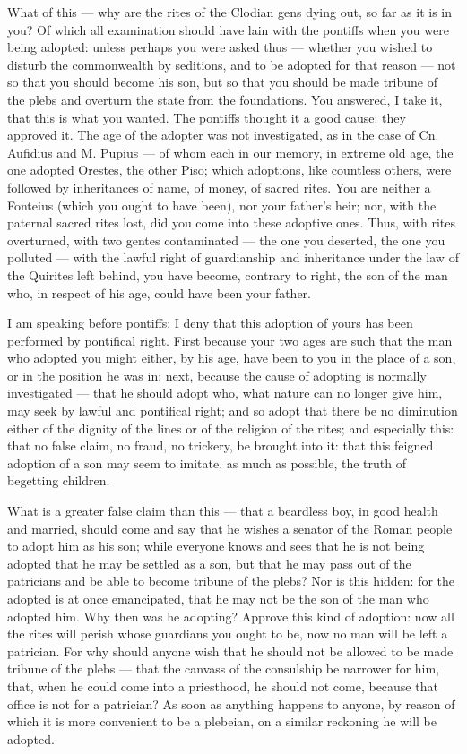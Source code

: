  What of this --- why are the rites of the Clodian gens dying out, so far as it is in you? Of which all examination should have lain with the pontiffs when you were being adopted: unless perhaps you were asked thus --- whether you wished to disturb the commonwealth by seditions, and to be adopted for that reason --- not so that you should become his son, but so that you should be made tribune of the plebs and overturn the state from the foundations. You answered, I take it, that this is what you wanted. The pontiffs thought it a good cause: they approved it. The age of the adopter was not investigated, as in the case of Cn. Aufidius and M. Pupius --- of whom each in our memory, in extreme old age, the one adopted Orestes, the other Piso; which adoptions, like countless others, were followed by inheritances of name, of money, of sacred rites. You are neither a Fonteius (which you ought to have been), nor your father's heir; nor, with the paternal sacred rites lost, did you come into these adoptive ones. Thus, with rites overturned, with two gentes contaminated --- the one you deserted, the one you polluted --- with the lawful right of guardianship and inheritance under the law of the Quirites left behind, you have become, contrary to right, the son of the man who, in respect of his age, could have been your father.

 I am speaking before pontiffs: I deny that this adoption of yours has been performed by pontifical right. First because your two ages are such that the man who adopted you might either, by his age, have been to you in the place of a son, or in the position he was in: next, because the cause of adopting is normally investigated --- that he should adopt who, what nature can no longer give him, may seek by lawful and pontifical right; and so adopt that there be no diminution either of the dignity of the lines or of the religion of the rites; and especially this: that no false claim, no fraud, no trickery, be brought into it: that this feigned adoption of a son may seem to imitate, as much as possible, the truth of begetting children.

 What is a greater false claim than this --- that a beardless boy, in good health and married, should come and say that he wishes a senator of the Roman people to adopt him as his son; while everyone knows and sees that he is not being adopted that he may be settled as a son, but that he may pass out of the patricians and be able to become tribune of the plebs? Nor is this hidden: for the adopted is at once emancipated, that he may not be the son of the man who adopted him. Why then was he adopting? Approve this kind of adoption: now all the rites will perish whose guardians you ought to be, now no man will be left a patrician. For why should anyone wish that he should not be allowed to be made tribune of the plebs --- that the canvass of the consulship be narrower for him, that, when he could come into a priesthood, he should not come, because that office is not for a patrician? As soon as anything happens to anyone, by reason of which it is more convenient to be a plebeian, on a similar reckoning he will be adopted.

